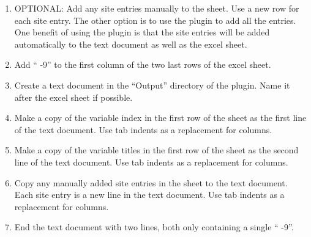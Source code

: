 \documentclass[letterpaper,10pt,english]{sphinxmanual}
\begin{document}
\begin{itemize}
\begin{description}
\begin{itemize}
\begin{enumerate}
\item {} 
OPTIONAL: Add any site entries manually to the sheet. Use a new row for each site entry. The other option is to use the plugin to add all the entries. One benefit of using the plugin is that the site entries will be added automatically to the text document as well as the excel sheet.

\item {} 
Add “  -9” to the first column of the two last rows of the excel sheet.

\item {} 
Create a text document in the “Output” directory of the plugin. Name it after the excel sheet if possible.

\item {} 
Make a copy of the variable index in the first row of the sheet as the first line of the text document. Use tab indents as a replacement for columns.

\item {} 
Make a copy of the variable titles in the first row of the sheet as the second line of the text document. Use tab indents as a replacement for columns.

\item {} 
Copy any manually added site entries in the sheet to the text document. Each site entry is a new line in the text document. Use tab indents as a replacement for columns.

\item {} 
End the text document with two lines, both only containing a single “  -9”.

\end{enumerate}

\end{itemize}

\end{description}

\end{itemize}
\end{document}
